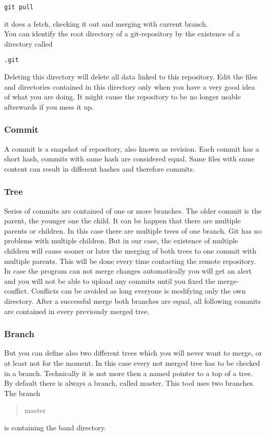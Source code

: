 \documentclass[10pt,a4paper,oneside]{article}
\begin{document}
\begin{verbatim}
git pull
\end{verbatim} it does a fetch, checking it out and merging with current branch. \\
You can identify the root directory of a git-repository by the existence of a directory called \begin{verbatim}
.git
\end{verbatim} Deleting this directory will delete all data linked to this repository. Edit the files and directories contained in this directory only when you have a very good idea of what you are doing. It might cause the repository to be no longer usable afterwards if you mess it up.

\subsubsection{Commit}
A commit is a snapshot of repository, also known as revision. Each commit has a short hash, commits with same hash are considered equal. Same files with same content can result in different hashes and therefore commits.

\subsubsection{Tree}
Series of commits are contained of one or more branches. The older commit is the parent, the younger one the child. It can be happen that there are multiple parents or children. In this case there are multiple trees of one branch. Git has no problems with multiple children. But in our case, the existence of multiple children will cause sooner or later the merging of both trees to one commit with multiple parents. This will be done every time contacting the remote repository. In case the program can not merge changes automatically you will get an alert and you will not be able to upload any commits until you fixed the merge-conflict. Conflicts can be avoided as long everyone is modifying only the own directory. After a successful merge both branches are equal, all following commits are contained in every previously merged tree.

\subsubsection{Branch}
But you can define also two different trees which you will never want to merge, or at least not for the moment. In this case every not merged tree has to be checked in a branch. Technically it is not more then a named pointer to a top of a tree. By default there is always a branch, called master. This tool uses two branches. The branch \begin{quote} master \end{quote} is containing the band directory.
\end{document}
